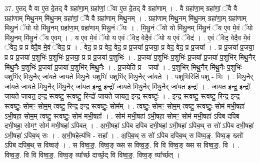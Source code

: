 \documentclass[17pt]{extarticle}
\begin{document}
37. ए॒तद् वै वा ए॒त दे॒तद् वै ग्रहा॑णा॒म् ग्रहा॑णां॒ ॅवा ए॒त दे॒तद् वै ग्रहा॑णाम् । . वै ग्रहा॑णा॒म् ग्रहा॑णां॒ ॅवै वै ग्रहा॑णाम् मिथु॒नम् मि॑थु॒नम् ग्रहा॑णां॒ ॅवै वै ग्रहा॑णाम् मिथु॒नम् । . ग्रहा॑णाम् मिथु॒नम् मि॑थु॒नम् ग्रहा॑णा॒म् ग्रहा॑णाम् मिथु॒नं ॅयो यो मि॑थु॒नम् ग्रहा॑णा॒म् ग्रहा॑णाम् मिथु॒नं ॅयः । . मि॒थु॒नं ॅयो यो मि॑थु॒नम् मि॑थु॒नं ॅय ए॒व मे॒वं ॅयो मि॑थु॒नम् मि॑थु॒नं ॅय ए॒वम् । . य ए॒व मे॒वं ॅयो य ए॒वं ॅवेद॒ वेदै॒वं ॅयो य ए॒वं ॅवेद॑ । . ए॒वं ॅवेद॒ वेदै॒व मे॒वं ॅवेद॒ प्र प्र वेदै॒व मे॒वं ॅवेद॒ प्र । . वेद॒ प्र प्र वेद॒ वेद॒ प्र प्र॒जया᳚ प्र॒जया॒ प्र वेद॒ वेद॒ प्र प्र॒जया᳚ । . प्र प्र॒जया᳚ प्र॒जया॒ प्र प्र प्र॒जया॑ प॒शुभिः॑ प॒शुभिः॑ प्र॒जया॒ प्र प्र प्र॒जया॑ प॒शुभिः॑ । . प्र॒जया॑ प॒शुभिः॑ प॒शुभिः॑ प्र॒जया᳚ प्र॒जया॑ प॒शुभि॑र् मिथु॒नैर् मि॑थु॒नैः प॒शुभिः॑ प्र॒जया᳚ प्र॒जया॑ प॒शुभि॑र् मिथु॒नैः । . प्र॒जयेति॑ प्र - जया᳚ । . प॒शुभि॑र् मिथु॒नैर् मि॑थु॒नैः प॒शुभिः॑ प॒शुभि॑र् मिथु॒नैर् जा॑यते जायते मिथु॒नैः प॒शुभिः॑ प॒शुभि॑र् मिथु॒नैर् जा॑यते । . प॒शुभि॒रिति॑ प॒शु - भिः॒ । . मि॒थु॒नैर् जा॑यते जायते मिथु॒नैर् मि॑थु॒नैर् जा॑यत॒ इन्द्र॒ इन्द्रो॑ जायते मिथु॒नैर् मि॑थु॒नैर् जा॑यत॒ इन्द्रः॑ । . जा॒य॒त॒ इन्द्र॒ इन्द्रो॑ जायते जायत॒ इन्द्र॒ स्त्वष्टु॒ स्त्वष्टु॒ रिन्द्रो॑ जायते जायत॒ इन्द्र॒ स्त्वष्टुः॑ । . इन्द्र॒ स्त्वष्टु॒ स्त्वष्टु॒ रिन्द्र॒ इन्द्र॒ स्त्वष्टुः॒ सोमꣳ॒॒ सोम॒म् त्वष्टु॒ रिन्द्र॒ इन्द्र॒ स्त्वष्टुः॒ सोम᳚म् । . त्वष्टुः॒ सोमꣳ॒॒ सोम॒म् त्वष्टु॒ स्त्वष्टुः॒ सोम॑ मभी॒षहा॑ ऽभी॒षहा॒ सोम॒म् त्वष्टु॒ स्त्वष्टुः॒ सोम॑ मभी॒षहा᳚ । . सोम॑ मभी॒षहा॑ ऽभी॒षहा॒ सोमꣳ॒॒ सोम॑ मभी॒षहा॑ ऽपिब दपिब दभी॒षहा॒ सोमꣳ॒॒ सोम॑ मभी॒षहा॑ ऽपिबत् । . अ॒भी॒षहा॑ ऽपिब दपिब दभी॒षहा॑ ऽभी॒षहा॑ ऽपिब॒थ् स सो॑ ऽपिब दभी॒षहा॑ ऽभी॒षहा॑ ऽपिब॒थ् सः । . अ॒भी॒षहेत्य॑भि - सहा᳚ । . अ॒पि॒ब॒थ् स सो॑ ऽपिब दपिब॒थ् स विष्व॒ङ्॒. विष्व॒ङ् ख्सो॑ ऽपिब दपिब॒थ् स विष्वङ्॑ । . स विष्व॒ङ्॒. विष्व॒ङ् ख्स स विष्व॒ङ्॒. वि वि विष्व॒ङ् ख्स स विष्व॒ङ्॒. वि । . विष्व॒ङ्॒. वि वि विष्व॒ङ्॒. विष्व॒ङ् व्या᳚र्च्छ दार्च्छ॒द् वि विष्व॒ङ्॒. विष्व॒ङ् व्या᳚र्च्छत् । \newline
\pagebreak
{}
\end{document}
